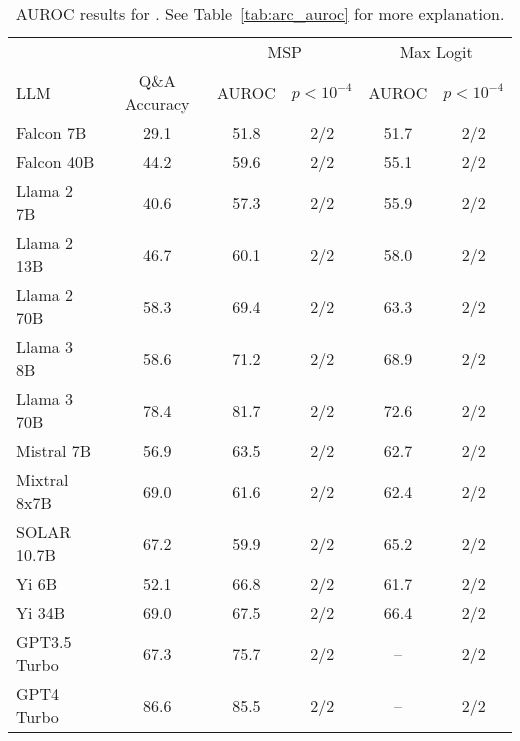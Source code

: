 \begin{table}[h]
\centering
\caption{AUROC results for . See Table~\ref{tab:arc_auroc} for more explanation.}
\label{tab:auroc}
\begin{tabular}{lccccc}
\toprule
& & \multicolumn{2}{c}{MSP} & \multicolumn{2}{c}{Max Logit} \\ 
LLM & Q\&A Accuracy & AUROC & $p < 10^{-4}$ & AUROC & $p < 10^{-4}$ \\ 
\cmidrule(lr){1-1} \cmidrule(lr){2-2} \cmidrule(lr){3-4} \cmidrule(lr){5-6} 
Falcon 7B & 29.1 & 51.8 & 2/2 & 51.7 & 2/2\\
Falcon 40B & 44.2 & 59.6 & 2/2 & 55.1 & 2/2\\
Llama 2 7B & 40.6 & 57.3 & 2/2 & 55.9 & 2/2\\
Llama 2 13B & 46.7 & 60.1 & 2/2 & 58.0 & 2/2\\
Llama 2 70B & 58.3 & 69.4 & 2/2 & 63.3 & 2/2\\
Llama 3 8B & 58.6 & 71.2 & 2/2 & 68.9 & 2/2\\
Llama 3 70B & 78.4 & 81.7 & 2/2 & 72.6 & 2/2\\
Mistral 7B & 56.9 & 63.5 & 2/2 & 62.7 & 2/2\\
Mixtral 8x7B & 69.0 & 61.6 & 2/2 & 62.4 & 2/2\\
SOLAR 10.7B & 67.2 & 59.9 & 2/2 & 65.2 & 2/2\\
Yi 6B & 52.1 & 66.8 & 2/2 & 61.7 & 2/2\\
Yi 34B & 69.0 & 67.5 & 2/2 & 66.4 & 2/2\\
GPT3.5 Turbo & 67.3 & 75.7 & 2/2 & -- & 2/2\\
GPT4 Turbo & 86.6 & 85.5 & 2/2 & -- & 2/2\\
\bottomrule
\end{tabular}
\end{table}

